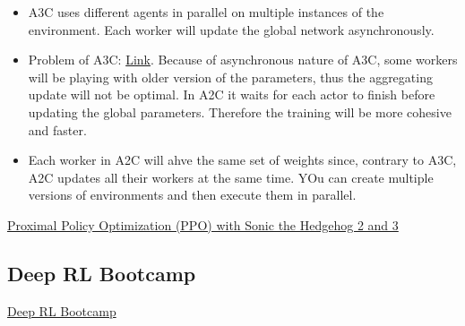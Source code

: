 \begin{itemize}[noitemsep,nolistsep]
	\item A3C uses different agents in parallel on multiple instances of the environment. Each worker will update the global network asynchronously.
	\item Problem of A3C: \href{https://lilianweng.github.io/lil-log/2018/04/08/policy-gradient-algorithms.html#a2c}{Link}. Because of asynchronous nature of A3C, some workers will be playing with older version of the parameters, thus the aggregating update will not be optimal. In A2C it waits for each actor to finish before updating the global parameters. Therefore the training will be more cohesive and faster.
	\item Each worker in A2C will ahve the same set of weights since, contrary to A3C, A2C updates all their workers at the same time. YOu can create multiple versions of environments and then execute them in parallel.
\end{itemize}
\href{https://towardsdatascience.com/proximal-policy-optimization-ppo-with-sonic-the-hedgehog-2-and-3-c9c21dbed5e}{Proximal Policy Optimization (PPO) with Sonic the Hedgehog 2 and 3}

\subsection{Deep RL Bootcamp}
\href{https://sites.google.com/view/deep-rl-bootcamp/lectures}{Deep RL Bootcamp}

